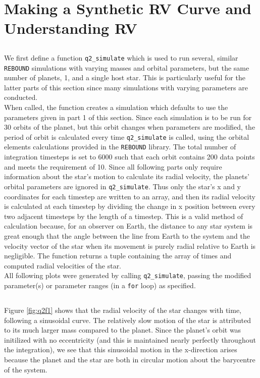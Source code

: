 \documentclass{article}
\newcommand{\for}{\texttt{for}}
\newcommand{\rebound}{\texttt{REBOUND}}
\newcommand{\simf}{\texttt{q2\_simulate}}
\begin{document}
\newpage
\section{Making a Synthetic RV Curve and Understanding RV}

\subsection{}

We first define a function \simf{} which is used to run several, similar \rebound{} simulations with varying masses and orbital parameters, but the same number of planets, 1, and a single host star. This is particularly useful for the latter parts of this section since many simulations with varying parameters are conducted. \\
When called, the function creates a simulation which defaults to use the parameters given in part 1 of this section. Since each simulation is to be run for 30 orbits of the planet, but this orbit changes when parameters are modified, the period of orbit is calculated every time \simf{} is called, using the orbital elements calculations provided in the \rebound{} library. The total number of integration timesteps is set to 6000 such that each orbit contains 200 data points and meets the requirement of 10. Since all following parts only require information about the star's motion to calculate its radial velocity, the planets' orbital parameters are ignored in \simf{}. Thus only the star's x and y coordinates for each timestep are written to an array, and then its radial velocity is calculated at each timestep by dividing the change in x position between every two adjacent timesteps by the length of a timestep. This is a valid method of calculation because, for an observer on Earth, the distance to any star system is great enough that the angle between the line from Earth to the system and the velocity vector of the star when its movement is purely radial relative to Earth is negligible. The function returns a tuple containing the array of times and computed radial velocities of the star. \\

All following plots were generated by calling \simf{}, passing the modified parameter(s) or parameter ranges (in a \for{} loop) as specified. \\

\subsection{}
Figure \ref{fig:q2f1} shows that the radial velocity of the star changes with time, following a sinusoidal curve. The relatively slow motion of the star is attributed to its much larger mass compared to the planet. Since the planet's orbit was initilized with no eccentricity (and this is maintained nearly perfectly throughout the integration), we see that this sinusoidal motion in the x-direction arises because the planet and the star are both in circular motion about the barycentre of the system. 
\end{document}
